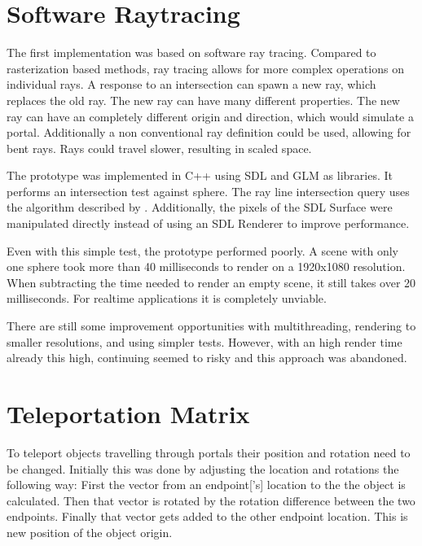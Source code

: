 \section{Software Raytracing}
The first implementation was based on software ray tracing. Compared to rasterization based methods, ray tracing allows for more complex operations on individual rays. A response to an intersection can spawn a new ray, which replaces the old ray. The new ray can have many different properties. The new ray can have an completely different origin and direction, which would simulate a portal. Additionally a non conventional ray definition could be used, allowing for bent rays. Rays could travel slower, resulting in scaled space.

The prototype was implemented in C++ using SDL \cite{sdl} and GLM \cite{glm} as libraries. It performs an intersection test against sphere. The ray line intersection query uses the algorithm described by \textcite{eberly:2006:3d}. Additionally, the pixels of the SDL Surface were manipulated directly instead of using an SDL Renderer to improve performance.

Even with this simple test, the prototype performed poorly. A scene with only one sphere took more than 40 milliseconds to render on a 1920x1080 resolution. When subtracting the time needed to render an empty scene, it still takes over 20 milliseconds. For realtime applications it is completely unviable.

There are still some improvement opportunities with multithreading, rendering to smaller resolutions, and using simpler tests. However, with an high render time already this high, continuing seemed to risky and this approach was abandoned.








\section{Teleportation Matrix}
\label{section:teleportationmatrix}
To teleport objects travelling through portals their position and rotation need to be changed. Initially this was done by adjusting the location and rotations the following way: First the vector from an \gls{endpoint}['s] location to the the object is calculated. Then that vector is rotated by the rotation difference between the two endpoints. Finally that vector gets added to the other endpoint location. This is new position of the object origin.

